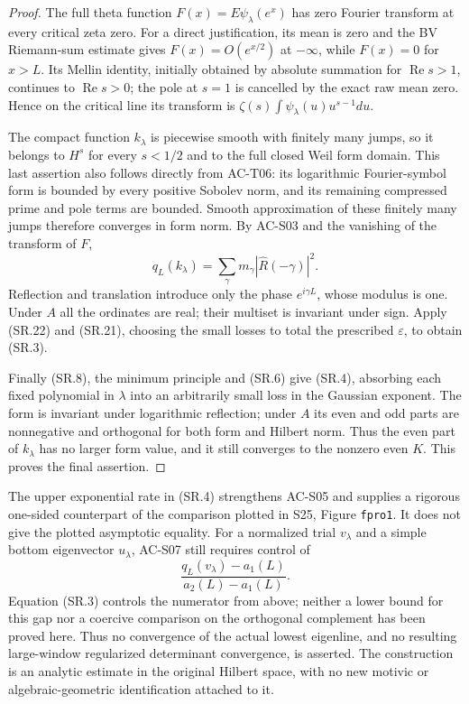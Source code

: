 \begin{proof}
The full theta function $F(x)=E\psi_\lambda(e^x)$
has zero Fourier transform at every critical zeta zero.
For a direct justification, its mean is zero and
the BV Riemann-sum estimate gives $F(x)=O(e^{x/2})$
at $-\infty$, while $F(x)=0$ for $x>L$.
Its Mellin identity, initially obtained by absolute
summation for $\operatorname{Re}s>1$, continues to
$\operatorname{Re}s>0$; the pole at $s=1$ is cancelled
by the exact raw mean zero.  Hence on the critical
line its transform is $\zeta(s)\int\psi_\lambda(u)u^{s-1}du$.

The compact function $k_\lambda$ is piecewise smooth
with finitely many jumps, so it belongs to $H^s$
for every $s<1/2$ and to the full closed Weil form
domain.  This last assertion also follows directly
from AC-T06: its logarithmic Fourier-symbol form is
bounded by every positive Sobolev norm, and its
remaining compressed prime and pole terms are bounded.
Smooth approximation of these finitely many jumps
therefore converges in form norm.
By AC-S03 and the vanishing of the transform of $F$,
\[
 q_L(k_\lambda)
       =\sum_\gamma m_\gamma|\widehat R(-\gamma)|^2.
                                                        \tag{SR.23}
\]
Reflection and translation introduce only the phase
$e^{i\gamma L}$, whose modulus is one.
Under $A$ all the ordinates are real; their multiset
is invariant under sign.  Apply (SR.22) and (SR.21),
choosing the small losses to total the prescribed
$\varepsilon$, to obtain (SR.3).

Finally (SR.8), the minimum principle and (SR.6) give
(SR.4), absorbing each fixed polynomial in $\lambda$
into an arbitrarily small loss in the Gaussian exponent.
The form is invariant under logarithmic reflection;
under $A$ its even and odd parts are nonnegative and
orthogonal for both form and Hilbert norm.
Thus the even part of $k_\lambda$ has no larger form
value, and it still converges to the nonzero even $K$.
This proves the final assertion.
\end{proof}

\begin{remark}
The upper exponential rate in (SR.4) strengthens AC-S05
and supplies a rigorous one-sided counterpart of the
comparison plotted in S25, Figure \texttt{fpro1}.
It does not give the plotted asymptotic equality.
For a normalized trial $v_\lambda$ and a simple bottom
eigenvector $u_\lambda$, AC-S07 still requires control of
\[
 \frac{q_L(v_\lambda)-a_1(L)}{a_2(L)-a_1(L)}.
\]
Equation (SR.3) controls the numerator from above;
neither a lower bound for this gap nor a coercive
comparison on the orthogonal complement has been
proved here.  Thus no convergence of the actual
lowest eigenline, and no resulting large-window
regularized determinant convergence, is asserted.
The construction is an analytic estimate in the
original Hilbert space, with no new motivic or
algebraic-geometric identification attached to it.
\end{remark}
